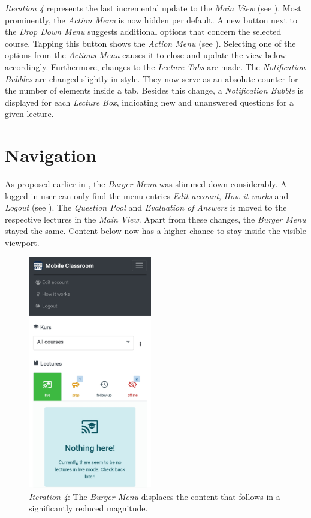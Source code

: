 \emph{Iteration 4} represents the last incremental update to the \emph{Main View} (see ).
Most prominently, the  \emph{Action Menu} is now hidden per default. 
A new button next to the \emph{Drop Down Menu} suggests additional options that concern the selected course. Tapping this button shows the \emph{Action Menu} (see ). Selecting one of the options from the \emph{Actions Menu} causes it to close and update the view below accordingly.
Furthermore, changes to the \emph{Lecture Tabs} are made. The \emph{Notification Bubbles} are changed slightly in style. They now serve as an absolute counter for the number of elements inside a tab.
Besides this change, a \emph{Notification Bubble} is displayed for each \emph{Lecture Box}, indicating new and unanswered questions for a given lecture. 
\section{Navigation}
As proposed earlier in , the \emph{Burger Menu} was slimmed down considerably. A logged in user can only find the menu entries \emph{Edit account}, \emph{How it works} and \emph{Logout} (see ).
The \emph{Question Pool} and \emph{Evaluation of Answers} is moved to the respective lectures in the \emph{Main View}. Apart from these changes, the \emph{Burger Menu} stayed the same. Content below now has a higher chance to stay inside the visible viewport.
\begin{figure}
	\vspace*{-4cm}
	\begin{center}
		\includegraphics[width=0.48\textwidth]{screenshots/redesign/navigation_new.jpg}
	\end{center}
	\captionsetup{format=plain}
	\caption{\emph{Iteration 4}: The \emph{Burger Menu} displaces the content that follows in a significantly reduced magnitude.}
	\label{fig:navigation}
\end{figure}
